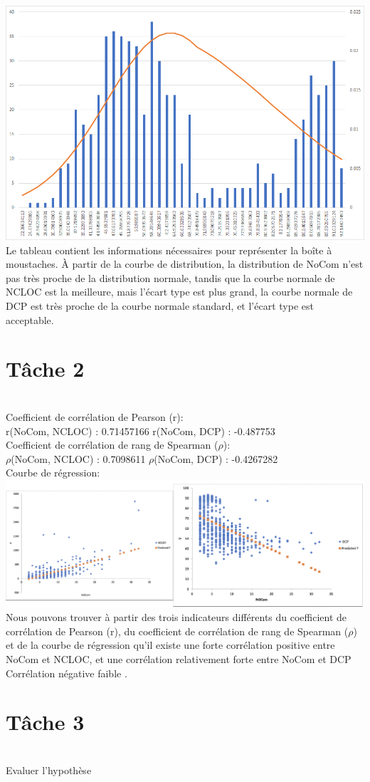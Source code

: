 \documentclass{article}
\begin{document}
\includegraphics[scale=0.35]{T1_4.png}\\

Le tableau contient les informations nécessaires pour représenter la boîte à moustaches. À partir de la courbe de distribution, la distribution de NoCom n'est pas très proche de la distribution normale, tandis que la courbe normale de NCLOC est la meilleure, mais l'écart type est plus grand, la courbe normale de DCP est très proche de la courbe normale standard, et l'écart type est acceptable.\\


\section*{Tâche 2}\\

Coefficient de corrélation de Pearson (r):\\

r(NoCom, NCLOC) : 0.71457166 \qquad r(NoCom, DCP) : -0.487753\\

Coefficient de corrélation de rang de Spearman ($\rho$):\\

$\rho$(NoCom, NCLOC) : 0.7098611 \qquad $\rho$(NoCom, DCP) : -0.4267282\\

Courbe de régression:\\
\includegraphics[scale=0.55]{T2.png}\\
Nous pouvons trouver à partir des trois indicateurs différents du coefficient de corrélation de Pearson (r), du coefficient de corrélation de rang de Spearman ($\rho$) et de la courbe de régression qu'il existe une forte corrélation positive entre NoCom et NCLOC, et une corrélation relativement forte entre NoCom et DCP Corrélation négative faible .





\section*{Tâche 3}\\
Evaluer l’hypothèse
\end{document}
